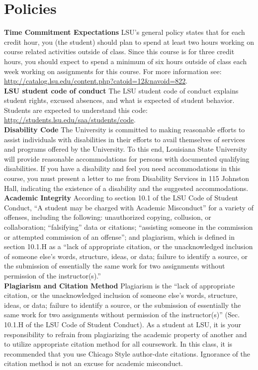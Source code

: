 \documentclass[11pt,article,oneside]{memoir}
\begin{document}
\section{Policies}

\noindent \textbf{Time Commitment Expectations}
LSU's general policy states that for each credit hour, you (the student) should plan to
spend at least two hours working on course related activities outside of class. Since this course is for three credit hours, you should expect to spend a minimum of six hours outside of class each week working on assignments for this course. For more information see: 
\url{http://catalog.lsu.edu/content.php?catoid=12&navoid=822}.\\

\noindent \textbf{LSU student code of conduct}
The LSU student code of conduct explains student rights, excused absences, and what is expected of student behavior. Students are expected to understand this code:  \url{http://students.lsu.edu/saa/students/code}.\\ %

\noindent \textbf{Disability Code}
The University is committed to making reasonable efforts to assist individuals with disabilities in
their efforts to avail themselves of services and programs offered by the University. To this end,
Louisiana State University will provide reasonable accommodations for persons with
documented qualifying disabilities. If you have a disability and feel you need accommodations in
this course, you must present a letter to me from Disability Services in 115 Johnston Hall,
indicating the existence of a disability and the suggested accommodations.\\

\noindent \textbf{Academic Integrity}
According to section 10.1 of the LSU Code of Student Conduct, ``A student may be charged with Academic Misconduct'' for a variety of offenses, including the following: unauthorized copying, collusion, or collaboration; ``falsifying'' data or citations; ``assisting someone in the commission or attempted commission of an offense''; and plagiarism, which is defined in section 10.1.H as a ``lack of appropriate citation, or the unacknowledged inclusion of someone else's words, structure, ideas, or data; failure to identify a source, or the submission of essentially the same work for two assignments without permission of the instructor(s).''\\

\noindent \textbf{Plagiarism and Citation Method}
Plagiarism is the ``lack of appropriate citation, or the unacknowledged inclusion of someone else's words, structure, ideas, or data; failure to identify a source, or the submission of essentially the same work for two assignments without permission of the instructor(s)'' (Sec. 10.1.H of the LSU Code of Student Conduct). As a student at LSU, it is your responsibility to refrain from plagiarizing the academic property of another and to utilize appropriate citation method for all coursework. In this class, it is recommended that you use Chicago Style author-date citations. Ignorance of the citation method is not an excuse for academic misconduct.
\end{document}
